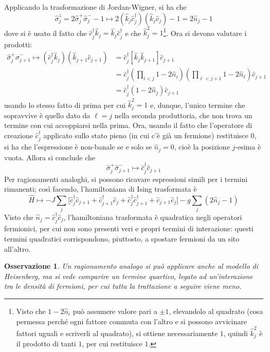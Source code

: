 \documentclass[11pt, a4paper]{scrartcl}
\theoremstyle{style}
\newtheorem{osservazione}{Osservazione}[section]
\theoremstyle{style1}
\numberwithin{equation}{subsection}
\begin{document}
\noindent Applicando la trasformazione di Jordan-Wigner, si ha che
\[
\hat{\sigma }_j^z = 2 \hat{\sigma }_j^+ \hat{\sigma }_j^- - 1 \longmapsto 2 (\hat{k}_j \hat{c}^\dagger _j)(\hat{k}_j \hat{c}_j) - 1 = 2 \hat{n}_j - 1
\] 
dove si \`e usato il fatto che $\hat{c}_j^\dagger \hat{k}_j = \hat{k}_j \hat{c}^\dagger _j$ e che $\hat{k}_j^2 = 1$\footnote{Visto che $1-2 \hat{n}_i$ pu\`o assumere valore pari a $\pm 1$, elevandolo al quadrato (cosa permessa perch\'e ogni fattore commuta con l'altro e si possono avvicinare fattori uguali e scriverli al quadrato), si ottiene necessariamente $1$, quindi $\hat{k}_j^2$ \`e il prodotto di tanti $1$, per cui restituisce $1$.}.
Ora si devono valutare i prodotti:
\[
	\begin{split}
		\hat{\sigma }^+_j \hat{\sigma }^-_{j+1} \longmapsto (\hat{c}^\dagger _j \hat{k}_j ) ( \hat{k}_{j+1} \hat{c}_{j+1} ) &= \hat{c}^\dagger _j \left[ \hat{k}_j \hat{k}_{j+1}  \right] \hat{c}_{j+1} \\
																    &=\hat{c}^\dagger _j \left(\prod_{i<j} 1 - 2 \hat{n}_i\right) \left(\prod_{\ell  < j+1} 1-2 \hat{n}_\ell  \right) \hat{c}_{j+1} \\
																    & = \hat{c}^\dagger _j (1-2\hat{n}_j) \hat{c}_{j+1} 
	\end{split}
\] 
usando lo stesso fatto di prima per cui $\hat{k}_j^2 = 1$ e, dunque, l'unico termine che sopravvive \`e quello dato da $\ell = j$ nella seconda produttoria, che non trova un termine con cui accoppiarsi nella prima.
Ora, usando il fatto che l'operatore di creazione $\hat{c}^\dagger _j$ applicato sullo stato pieno (in cui c'\`e gi\`a un fermione) restituisce $0$, si ha che l'espressione \`e non-banale se e solo se $\hat{n}_j = 0$, cio\`e la posizione $j$-esima \`e vuota. Allora si conclude che 
\[
\hat{\sigma }_j ^+ \hat{\sigma }_{j+1} ^- \longmapsto \hat{c}_j^\dagger \hat{c}_{j+1} 
\] 
Per ragionamenti analoghi, si possono ricavare espressioni simili per i termini rimanenti; cos\`i facendo, l'hamiltoniana di Ising trasformata \`e
\[
	\hat{H} \longmapsto - J \sum_{j}^{} \Big[\hat{c}^\dagger _j \hat{c}_{j+1} + \hat{c}^\dagger _{j+1} \hat{c}_j + \hat{c}_j^\dagger \hat{c}_{j+1} ^\dagger + \hat{c}_{j+1} \hat{c}_j\Big] - g \sum_{j}^{} \left(2 \hat{n}_j -1\right) 
\] 
Visto che $\hat{n}_j = \hat{c}_j^\dagger \hat{c}_j$, l'hamiltoniana trasformata \`e quadratica negli operatori fermionici, per cui non sono presenti veri e propri termini di interazione: questi termini quadratici corrispondono, piuttosto, a spostare fermioni da un sito all'altro.
\begin{osservazione}
Un ragionamento analogo si pu\`o applicare anche al modello di Heisenberg, ma si vede comparire un termine quartico, legato ad un'interazione tra le densit\`a di fermioni, per cui tutta la trattazione a seguire viene meno. 
\end{osservazione}
\end{document}
